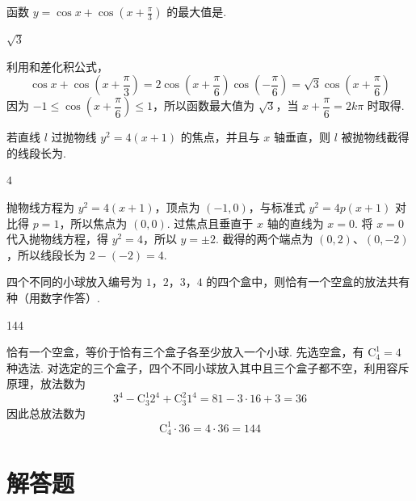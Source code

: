 \documentclass[UTF8,a4paper,oneside,11pt]{ctexbook}
\begin{document}
\begin{problem}
函数 \(y = \cos x + \cos \left(x + \frac{\pi}{3} \right) \) 的最大值是\fillinblank{}.
\end{problem}

\begin{answer}
\(\sqrt{3}\)
\end{answer}

\begin{solution}
利用和差化积公式，
\[
\cos x+\cos\left(x+\frac{\pi}{3}\right)
=2\cos\left(x+\frac{\pi}{6}\right)\cos\left(-\frac{\pi}{6}\right)
=\sqrt3\cos\left(x+\frac{\pi}{6}\right)
\]
因为 \(-1\leqslant\cos\left(x+\dfrac{\pi}{6}\right)\leqslant1\)，所以函数最大值为 \(\sqrt3\)，当 \(x+\dfrac{\pi}{6}=2k\pi\) 时取得.
\end{solution}

\begin{problem}
若直线 \(l\) 过抛物线 \(y^{2}=4(x+1) \) 的焦点，并且与 \(x\) 轴垂直，则 \(l\) 被抛物线截得的线段长为\fillinblank{}.
\end{problem}

\begin{answer}
\(4\)
\end{answer}

\begin{solution}
抛物线方程为 \(y^2=4(x+1)\)，顶点为 \((-1,0)\)，与标准式 \(y^2=4p(x+1)\) 对比得 \(p=1\)，所以焦点为 \((0,0)\). 过焦点且垂直于 \(x\) 轴的直线为 \(x=0\). 将 \(x=0\) 代入抛物线方程，得 \(y^2=4\)，所以 \(y=\pm2\).
截得的两个端点为 \((0,2)\)、\((0,-2)\)，所以线段长为 \(2-(-2)=4\).
\end{solution}

\begin{problem}
四个不同的小球放入编号为 \(1\)，\(2\)，\(3\)，\(4\) 的四个盒中，则恰有一个空盒的放法共有\fillinblank{}种（用数字作答）.
\end{problem}

\begin{answer}
144
\end{answer}

\begin{solution}
恰有一个空盒，等价于恰有三个盒子各至少放入一个小球. 先选空盒，有 \(\mathrm C_4^1=4\) 种选法. 对选定的三个盒子，四个不同小球放入其中且三个盒子都不空，利用容斥原理，放法数为
\[
3^4-\mathrm C_3^1 2^4+\mathrm C_3^2 1^4
=81-3\cdot16+3=36
\]
因此总放法数为
\[
\mathrm C_4^1\cdot36=4\cdot36=144
\]
\end{solution}

\section{解答题}
\end{document}
